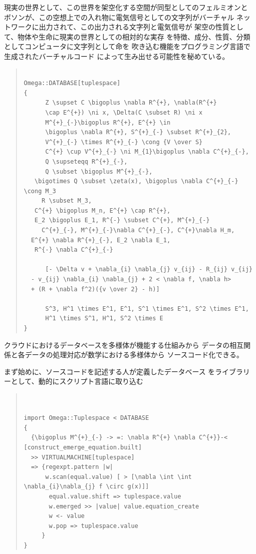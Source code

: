\documentclass{jsarticle}
\begin{document}
  現実の世界として、この世界を架空化する空間が同型としてのフェルミオンと
  ボソンが、この空想上での入れ物に電気信号としての文字列がバーチャル
  ネットワークに出力されて、この出力される文字列と電気信号が
  架空の性質として、物体や生命に現実の世界としての相対的な実存
  を特徴、成分、性質、分類としてコンピュータに文字列として命を
  吹き込む機能をプログラミング言語で生成されたバーチャルコード
  によって生み出せる可能性を秘めている。　
\begin{quote}
\setlength{\baselineskip}{12pt}
\begin{verbatim}

Omega::DATABASE[tuplespace]
{
      Z \supset C \bigoplus \nabla R^{+}, \nabla(R^{+} 
      \cap E^{+}) \ni x, \Delta(C \subset R) \ni x   
      M^{+}_{-}\bigoplus R^{+}, E^{+} \in 
      \bigoplus \nabla R^{+}, S^{+}_{-} \subset R^{+}_{2}, 
      V^{+}_{-} \times R^{+}_{-} \cong {V \over S}   
      C^{+} \cup V^{+}_{-} \ni M_{1}\bigoplus \nabla C^{+}_{-}, 
      Q \supseteqq R^{+}_{-}, 
      Q \subset \bigoplus M^{+}_{-}, 
   \bigotimes Q \subset \zeta(x), \bigoplus \nabla C^{+}_{-} \cong M_3   
     R \subset M_3,
   C^{+} \bigoplus M_n, E^{+} \cap R^{+},
   E_2 \bigoplus E_1, R^{-} \subset C^{+}, M^{+}_{-}   
     C^{+}_{-}, M^{+}_{-}\nabla C^{+}_{-}, C^{+}\nabla H_m,
  E^{+} \nabla R^{+}_{-}, E_2 \nabla E_1, 
   R^{-} \nabla C^{+}_{-}   

      [- \Delta v + \nabla_{i} \nabla_{j} v_{ij} - R_{ij} v_{ij} 
  - v_{ij} \nabla_{i} \nabla_{j} + 2 < \nabla f, \nabla h> 
  + (R + \nabla f^2)({v \over 2} - h)]    

      S^3, H^1 \times E^1, E^1, S^1 \times E^1, S^2 \times E^1, 
      H^1 \times S^1, H^1, S^2 \times E
}

\end{verbatim}
\end{quote}


 クラウドにおけるデータベースを多様体が機能する仕組みから
 データの相互関係と各データの処理対応が数学における多様体から
 ソースコード化できる。


 まず始めに、ソースコードを記述する人が定義したデータベース
 をライブラリーとして、動的にスクリプト言語に取り込む
\begin{quote}
\setlength{\baselineskip}{12pt}
\begin{verbatim}


import Omega::Tuplespace < DATABASE
{
  {\bigoplus M^{+}_{-} -> =: \nabla R^{+} \nabla C^{+}}-< [construct_emerge_equation.built]
  >> VIRTUALMACHINE[tuplespace]
  => {regexpt.pattern |w|
      w.scan(equal.value) [ > [\nabla \int \int \nabla_{i}\nabla_{j} f \circ g(x)]]
       equal.value.shift => tuplespace.value
       w.emerged >> |value| value.equation_create 
       w <- value
       w.pop => tuplespace.value
     }
} 
\end{verbatim}
\end{quote}
\end{document}
